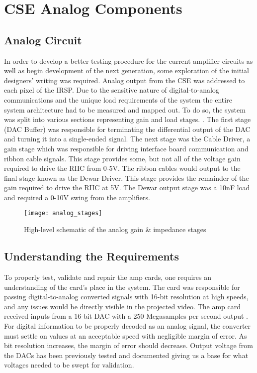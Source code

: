 %
%
\chapter{CSE Analog Components}
\section{Analog Circuit}
In order to develop a better testing procedure for the current amplifier circuits as well as begin development of the next generation, some exploration of the initial designers' writing was required. Analog output from the CSE was addressed to each pixel of the IRSP. Due to the sensitive nature of digital-to-analog communications and the unique load requirements of the system the entire system architecture had to be measured and mapped out. To do so, the system was split into various sections representing gain and load stages. \cite{marks}. The first stage (DAC Buffer) was responsible for terminating the differential output of the DAC and turning it into a single-ended signal. The next stage was the Cable Driver, a gain stage which was responsible for driving interface board communication and ribbon cable signals. This stage provides some, but not all of the voltage gain required to drive the RIIC from 0-5V. The ribbon cables would output to the final stage known as the Dewar Driver. This stage provides the remainder of the gain required to drive the RIIC at 5V. The Dewar output stage was a 10nF load and required a 0-10V swing from the amplifiers. \par
\begin{figure}[!htb]
	\texttt{[image: analog\_stages]}
	\centering
	\caption{High-level schematic of the analog gain \& impedance stages}
	\centering
\end{figure}
\section{Understanding the Requirements}
To properly test, validate and repair the amp cards, one requires an understanding of the card's place in the system. The card was responsible for passing digital-to-analog converted signals with 16-bit resolution at high speeds, and any issues would be directly visible in the projected video. The amp card received inputs from a 16-bit DAC with a 250 Megasamples per second output \cite{marks}. For digital information to be properly decoded as an analog signal, the converter must settle on values at an acceptable speed with negligible margin of error. As bit resolution increases, the margin of error should decrease. Output voltage from the DACs has been previously tested and documented giving us a base for what voltages needed to be swept for validation. \par


